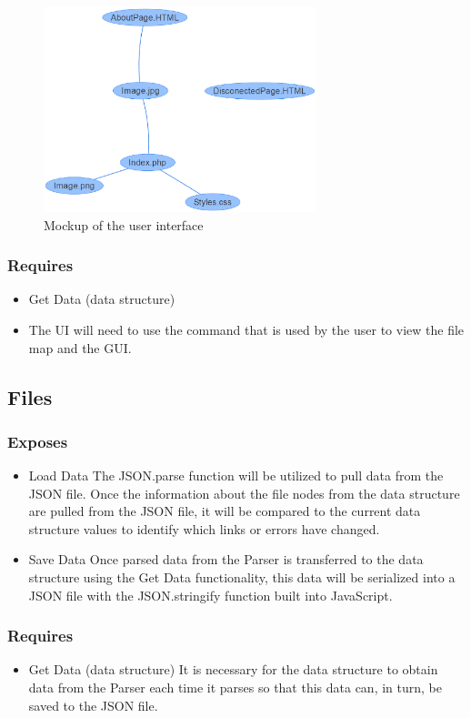 \documentclass[letterpaper,10pt,titlepage,draftclsnofoot,onecolumn,onesided] {IEEEtran}
\begin{document}
\begin{itemize}
		\begin{figure}
                 \includegraphics[width=300px]{UIMockupEPS.eps}
                 \caption{Mockup of the user interface}
      		\end{figure}
		
		\subsubsection{Requires}
		\begin{itemize}
			\item Get Data (data structure)
			\item The UI will need to use the command that is used by the user to view the file map and the GUI.
		\end{itemize}
		
	\subsection{Files}
		\subsubsection{Exposes}
		\begin{itemize}
			\item Load Data
			The JSON.parse function will be utilized to pull data from the JSON file. 
			Once the information about the file nodes from the data structure are pulled from the JSON file, it will be compared to the current data structure values to identify which links or errors have changed. \cite{stringify}
			\item Save Data
			Once parsed data from the Parser is transferred to the data structure using the Get Data functionality, this data will be serialized into a JSON file with the JSON.stringify function built into JavaScript.
		\end{itemize}
		\subsubsection{Requires}
		\begin{itemize}
			\item Get Data (data structure)
			It is necessary for the data structure to obtain data from the Parser each time it parses so that this data can, in turn, be saved to the JSON file.
		\end{itemize}



\end{itemize}
\end{document}
